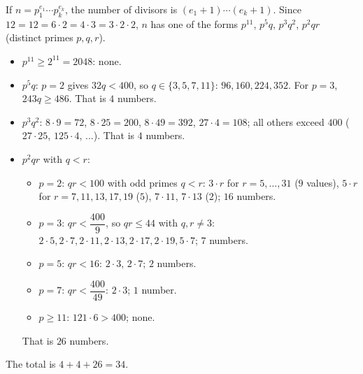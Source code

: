 If $n=p_1^{e_1}\cdots p_k^{e_k}$, the number of divisors is $(e_1+1)\cdots(e_k+1)$. Since $12=12=6\cdot2=4\cdot3=3\cdot2\cdot2$, $n$ has one of the forms $p^{11}$, $p^5q$, $p^3q^2$, $p^2qr$ (distinct primes $p,q,r$).
\begin{itemize}
\item $p^{11}\ge2^{11}=2048$: none.
\item $p^5q$: $p=2$ gives $32q<400$, so $q\in\{3,5,7,11\}$: $96,160,224,352$. For $p=3$, $243q\ge486$. That is $4$ numbers.
\item $p^3q^2$: $8\cdot9=72$, $8\cdot25=200$, $8\cdot49=392$, $27\cdot4=108$; all others exceed $400$ ($27\cdot25$, $125\cdot4$, ...). That is $4$ numbers.
\item $p^2qr$ with $q<r$:
\begin{itemize}
\item $p=2$: $qr<100$ with odd primes $q<r$: $3\cdot r$ for $r=5,\dots,31$ ($9$ values), $5\cdot r$ for $r=7,11,13,17,19$ ($5$), $7\cdot11$, $7\cdot13$ ($2$); $16$ numbers.
\item $p=3$: $qr<\dfrac{400}{9}$, so $qr\le44$ with $q,r\ne3$: $2\cdot5,2\cdot7,2\cdot11,2\cdot13,2\cdot17,2\cdot19,5\cdot7$; $7$ numbers.
\item $p=5$: $qr<16$: $2\cdot3$, $2\cdot7$; $2$ numbers.
\item $p=7$: $qr<\dfrac{400}{49}$: $2\cdot3$; $1$ number.
\item $p\ge11$: $121\cdot6>400$; none.
\end{itemize}
That is $26$ numbers.
\end{itemize}
The total is $4+4+26=\boxed{34}$.
